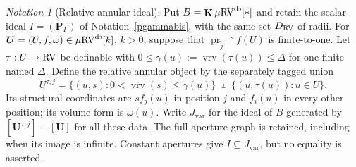\documentclass[12pt]{amsart}
\theoremstyle{plain}
\theoremstyle{definition}
\theoremstyle{remark}
\newtheorem{nota}[thm]{Notation}
\numberwithin{equation}{section}
\theoremstyle{plain}
\newcommand{\RV}{\textup{RV}}
\DeclareMathOperator{\pr}{pr}
\newcommand{\0}{\emptyset}
\newcommand{\rest}{\upharpoonright}
\newcommand{\mRV}{{\mu}{\RV}}
\newcommand{\mgRV}{{\mu}{\RV}}
\DeclareMathOperator{\ggk}{\mathbf{K}}
\DeclareMathOperator{\vrv}{vrv}
\DeclareMathOperator{\db}{d \! b}
\begin{document}
\begin{nota}[Relative annular ideal]\label{relative:annular:ideal}
Put $B=\ggk\mgRV^{\db}[*]$ and retain the scalar ideal
$I=(\bm P_\Gamma)$ of Notation~\ref{pgammabis}, with the same set
$D_{\RV}$ of radii. For
$\bm U=(U,f,\omega)\in\mRV^{\db}[k]$, $k>0$, suppose that
$\pr_{\widetilde j}\rest f(U)$ is finite-to-one. Let
$\tau:U\to\RV$ be definable with
$0\leq\gamma(u):=\vrv(\tau(u))\leq\Delta$ for one finite named
$\Delta$. Define the relative annular object by the separately tagged
union
\[
 U^{\tau,j}=\{(u,s):0<\vrv(s)\leq\gamma(u)\}
 \ \uplus\ \{(u,\tau(u)):u\in U\}.
\]
Its structural coordinates are $sf_j(u)$ in position $j$ and $f_i(u)$
in every other position; its volume form is $\omega(u)$.
Write $J_{\mathrm{var}}$ for the ideal of $B$ generated by
$[\bm U^{\tau,j}]-[\bm U]$ for all these data. The full aperture graph
is retained, including when its image is infinite. Constant apertures
give $I\subseteq J_{\mathrm{var}}$, but no equality is asserted.
\end{nota}
\end{document}
